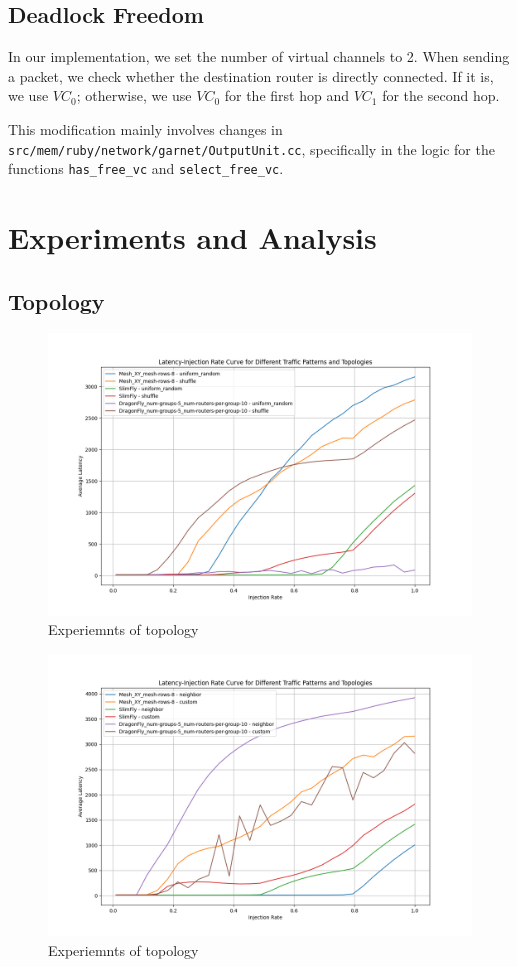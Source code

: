 \documentclass[utf8]{article}
\begin{document}
\subsection{Deadlock Freedom}

In our implementation, we set the number of virtual channels to 2. When sending a packet, we check whether the destination router is directly connected. If it is, we use \(VC_0\); otherwise, we use \(VC_0\) for the first hop and \(VC_1\) for the second hop.

This modification mainly involves changes in \texttt{src/mem/ruby/network/garnet/OutputUnit.cc}, specifically in the logic for the functions \texttt{has\_free\_vc} and \texttt{select\_free\_vc}.

\section{Experiments and Analysis}

\subsection{Topology}

\begin{figure}[H]
    \centering
    \includegraphics[width=0.85\linewidth]{topology_1.png}
    \caption{Experiemnts of topology}
\end{figure}

\begin{figure}[H]
    \centering
    \includegraphics[width=0.85\linewidth]{topology_2.png}
    \caption{Experiemnts of topology}
\end{figure}
\end{document}
